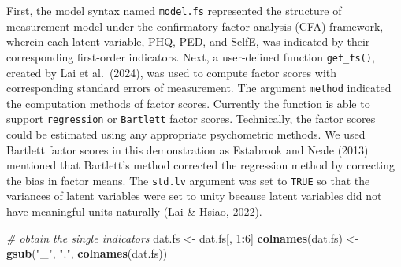 \documentclass[
  man]{apa7}
\newenvironment{Shaded}{\begin{snugshade}}{\end{snugshade}}
\newcommand{\CommentTok}[1]{\textcolor[rgb]{0.56,0.35,0.01}{\textit{#1}}}
\newcommand{\DecValTok}[1]{\textcolor[rgb]{0.00,0.00,0.81}{#1}}
\newcommand{\FunctionTok}[1]{\textcolor[rgb]{0.13,0.29,0.53}{\textbf{#1}}}
\newcommand{\NormalTok}[1]{#1}
\newcommand{\OtherTok}[1]{\textcolor[rgb]{0.56,0.35,0.01}{#1}}
\newcommand{\SpecialCharTok}[1]{\textcolor[rgb]{0.81,0.36,0.00}{\textbf{#1}}}
\newcommand{\StringTok}[1]{\textcolor[rgb]{0.31,0.60,0.02}{#1}}
\begin{document}
First, the model syntax named \texttt{model.fs} represented the structure of measurement model under the confirmatory factor analysis (CFA) framework, wherein each latent variable, PHQ, PED, and SelfE, was indicated by their corresponding first-order indicators. Next, a user-defined function \texttt{get\_fs()}, created by Lai et al.~(2024), was used to compute factor scores with corresponding standard errors of measurement. The argument \texttt{method} indicated the computation methods of factor scores. Currently the function is able to support \texttt{regression} or \texttt{Bartlett} factor scores. Technically, the factor scores could be estimated using any appropriate psychometric methods. We used Bartlett factor scores in this demonstration as Estabrook and Neale (2013) mentioned that Bartlett's method corrected the regression method by correcting the bias in factor means. The \texttt{std.lv} argument was set to \texttt{TRUE} so that the variances of latent variables were set to unity because latent variables did not have meaningful units naturally (Lai \& Hsiao, 2022).

\begin{Shaded}
\begin{Highlighting}[]
\CommentTok{\# obtain the single indicators}
\NormalTok{dat.fs }\OtherTok{\textless{}{-}}\NormalTok{ dat.fs[, }\DecValTok{1}\SpecialCharTok{:}\DecValTok{6}\NormalTok{]}
\FunctionTok{colnames}\NormalTok{(dat.fs) }\OtherTok{\textless{}{-}} \FunctionTok{gsub}\NormalTok{(}\StringTok{"\_"}\NormalTok{, }\StringTok{"."}\NormalTok{, }\FunctionTok{colnames}\NormalTok{(dat.fs))}
\end{Highlighting}
\end{Shaded}
\end{document}
